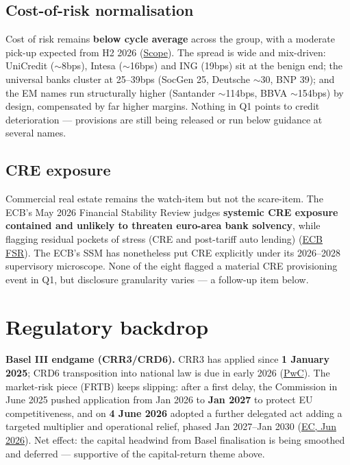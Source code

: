 \documentclass[10pt,a4paper]{article}
\begin{document}
\subsection*{Cost-of-risk normalisation}
Cost of risk remains \textbf{below cycle average} across the group, with a moderate pick-up expected from H2 2026 (\href{https://www.scoperatings.com/ratings-and-research/research/EN/179762}{Scope}). The spread is wide and mix-driven: UniCredit ($\sim$8bps), Intesa ($\sim$16bps) and ING (19bps) sit at the benign end; the universal banks cluster at 25--39bps (SocGen 25, Deutsche $\sim$30, BNP 39); and the EM names run structurally higher (Santander $\sim$114bps, BBVA $\sim$154bps) by design, compensated by far higher margins. Nothing in Q1 points to credit deterioration --- provisions are still being released or run below guidance at several names.

\subsection*{CRE exposure}
Commercial real estate remains the watch-item but not the scare-item. The ECB's May 2026 Financial Stability Review judges \textbf{systemic CRE exposure contained and unlikely to threaten euro-area bank solvency}, while flagging residual pockets of stress (CRE and post-tariff auto lending) (\href{https://www.ecb.europa.eu/press/financial-stability-publications/fsr/html/ecb.fsr202605~50566915a7.en.html}{ECB FSR}). The ECB's SSM has nonetheless put CRE explicitly under its 2026--2028 supervisory microscope. None of the eight flagged a material CRE provisioning event in Q1, but disclosure granularity varies --- a follow-up item below.

\section{Regulatory backdrop}

\textbf{Basel III endgame (CRR3/CRD6).} CRR3 has applied since \textbf{1 January 2025}; CRD6 transposition into national law is due in early 2026 (\href{https://www.pwc.com/gx/en/services/audit-assurance/risk-assurance/ssm-eba-office/eu-publishes-crr3-crd6-official-journal.html}{PwC}). The market-risk piece (FRTB) keeps slipping: after a first delay, the Commission in June 2025 pushed application from Jan 2026 to \textbf{Jan 2027} to protect EU competitiveness, and on \textbf{4 June 2026} adopted a further delegated act adding a targeted multiplier and operational relief, phased Jan 2027--Jan 2030 (\href{https://finance.ec.europa.eu/news/eu-temporarily-amends-prudential-rules-banks-market-risk-2026-06-08_en}{EC, Jun 2026}). Net effect: the capital headwind from Basel finalisation is being smoothed and deferred --- supportive of the capital-return theme above.
\end{document}

